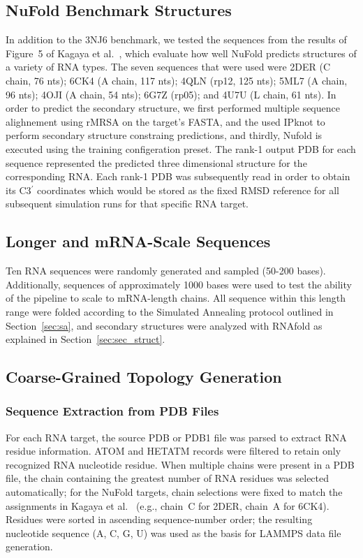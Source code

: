 \subsection{NuFold Benchmark Structures}
\label{sec:nufold}

In addition to the 3NJ6 benchmark, we tested the sequences from the results of Figure~5 of Kagaya et al.~\cite{Kagaya2025}, which evaluate how well NuFold predicts structures of a variety of RNA types. The seven sequences that were used were 2DER (C chain, 76 nts); 6CK4 (A chain, 117 nts); 4QLN (rp12, 125 nts); 5ML7 (A chain, 96 nts); 4OJI (A chain, 54 nts); 6G7Z (rp05); and 4U7U (L chain, 61 nts). 
In order to predict the secondary structure, we first performed multiple sequence alighnement using rMRSA on the target's FASTA, and the used IPknot to perform secondary structure constraing predictions, and thirdly, Nufold is executed using the training configeration preset. The rank-1 output PDB for each sequence represented the predicted three dimensional structure for the corresponding RNA. Each rank-1 PDB was subsequently read in order to obtain its C3$^\prime$ coordinates which would be stored as the fixed RMSD reference for all subsequent simulation runs for that specific RNA target.


\subsection{Longer and mRNA-Scale Sequences}
\label{sec:longer_seqs}

Ten RNA sequences were randomly generated and sampled (50-200 bases). Additionally, sequences of approximately 1000 bases were used to test the ability of the pipeline to scale to mRNA-length chains. All sequence within this length range were folded according to the Simulated Annealing protocol outlined in Section~\ref{sec:sa}, and secondary structures were analyzed with RNAfold as explained in Section~\ref{sec:sec_struct}.

\subsection{Coarse-Grained Topology Generation}
\label{sec:topology}

\subsubsection{Sequence Extraction from PDB Files}

For each RNA target, the source PDB or PDB1 file was parsed to extract
RNA residue information.
ATOM and HETATM records were filtered to retain only recognized RNA nucleotide residue.
When multiple chains were present in a PDB file, the chain containing
the greatest number of RNA residues was selected automatically; for
the NuFold targets, chain selections were fixed to match the
assignments in Kagaya et al.~\cite{Kagaya2025}
(e.g., chain~C for 2DER, chain~A for 6CK4).
Residues were sorted in ascending sequence-number order; the resulting
nucleotide sequence (A, C, G, U) was used as the basis for LAMMPS data
file generation.


